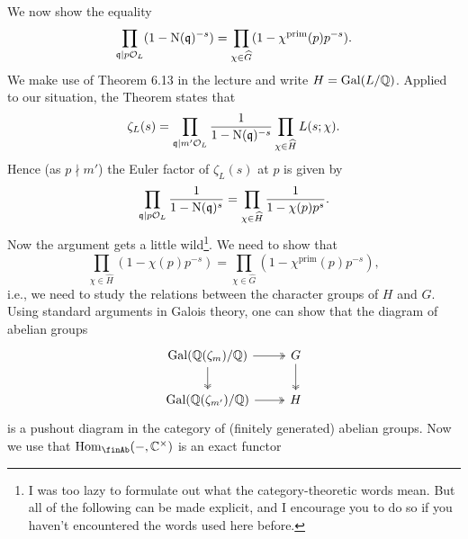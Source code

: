\documentclass[a4paper,11pt]{article}
\begin{document}
\begin{enumerate}[wide, labelindent=0pt]
        We now show the equality
        \begin{equation*}
            \prod_{\mathfrak{q} \mid p\mathcal{O}_L} (1 - \operatorname{N}(\mathfrak{q})^{-s}) =
            \prod_{\chi \in \widehat G} (1 - \chi^{\mathrm{prim}}(p) p^{-s}).
        \end{equation*}
        We make use of Theorem 6.13 in the lecture and write 
        $H = \operatorname{Gal}(L/\mathbb{Q})$. Applied to our situation, the Theorem states that 
        \begin{equation*}
            \zeta_L(s) = \prod_{\mathfrak{q} \mid m' \mathcal{O}_L} \frac{1}{1-\operatorname{N}(\mathfrak{q})^{-s}}
                         \prod_{\chi \in \widehat {H}} L(s;\chi).
        \end{equation*}
        Hence (as $p \nmid m'$) the Euler factor of $\zeta_L(s)$ at $p$ is given by 
        \begin{equation*}
            \prod_{\mathfrak{q} \mid p\mathcal{O}_L}\frac{1}{1-\operatorname{N}(\mathfrak{q})^{s}} = \prod_{\chi \in
            \widehat H} \frac{1}{1-\chi(p)p^s}.
        \end{equation*}
        Now the argument gets a little wild\footnote{I was too lazy to formulate out what
            the category-theoretic words mean. But all of the following can be made
            explicit, and I encourage you to do so if you haven't encountered
            the words used here before.}. 
        We need to show that 
        \begin{equation*}
            \prod_{\chi \in \hat H}(1- \chi(p)p^{-s}) = \prod_{\chi \in \hat G}
            (1 - \chi^{\mathrm{prim}}(p)p^{-s}),
        \end{equation*}
        i.e., we need to study the relations between the character groups of $H$ and $G$.
        Using standard arguments in Galois
        theory, one can show that the diagram of abelian groups 
        \begin{equation*}
            \begin{tikzcd}[ampersand replacement=\&]
            	{\Gal(\Q(\zeta_m)/\Q)} \& G \\
            	{\Gal(\Q(\zeta_{m'})/\Q)} \& {H }
            	\arrow[two heads, from=1-2, to=2-2]
            	\arrow[two heads, from=1-1, to=2-1]
            	\arrow[two heads, from=1-1, to=1-2]
            	\arrow[two heads, from=2-1, to=2-2]
            \end{tikzcd}
        \end{equation*}
        is a pushout diagram in the category of (finitely generated) abelian
        groups. Now we use that $\Hom_{\finAb}(-, \C^\times)$ is an exact functor

\end{enumerate}
\end{document}
